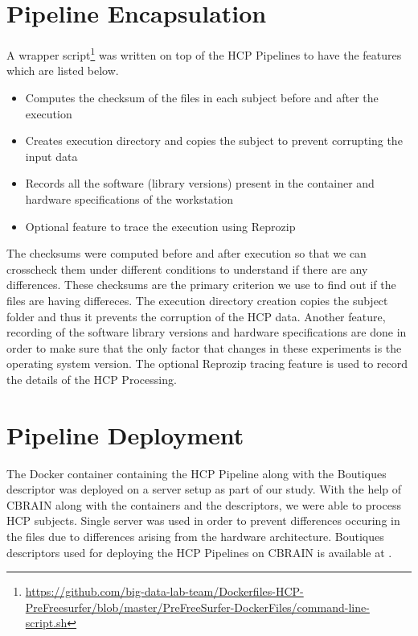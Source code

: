 \section{Pipeline Encapsulation}
A wrapper script\footnote{\url{https://github.com/big-data-lab-team/Dockerfiles-HCP-PreFreesurfer/blob/master/PreFreeSurfer-DockerFiles/command-line-script.sh}} was written on top of the HCP Pipelines to have the features which are listed below. 
\begin{itemize}
  \item Computes the checksum of the files in each subject before and after the execution
  \item Creates execution directory and copies the subject to prevent corrupting the input data
  \item Records all the software (library versions) present in the container and hardware specifications of the workstation
  \item Optional feature to trace the execution using Reprozip
\end{itemize}

The checksums were computed before and after execution so that we can crosscheck them under different conditions to understand if there are any differences. These checksums are the primary criterion we use to find out if the files are having differeces. The execution directory creation copies the subject folder and thus it prevents the corruption of the HCP data. Another feature, recording of the software library versions and hardware specifications are done in order to make sure that the only factor that changes in these experiments is the operating system version. The optional Reprozip tracing feature is used to record the details of the HCP Processing.

\section{Pipeline Deployment}
The Docker container containing the HCP Pipeline along with the Boutiques descriptor was deployed on a server setup as part of our study. With the help of CBRAIN along with the containers and the descriptors, we were able to process HCP subjects. Single server was used in order to prevent differences occuring in the files due to differences arising from the hardware architecture. Boutiques descriptors used for deploying the HCP Pipelines on CBRAIN is available at \cite{HCP_descriptors}.


